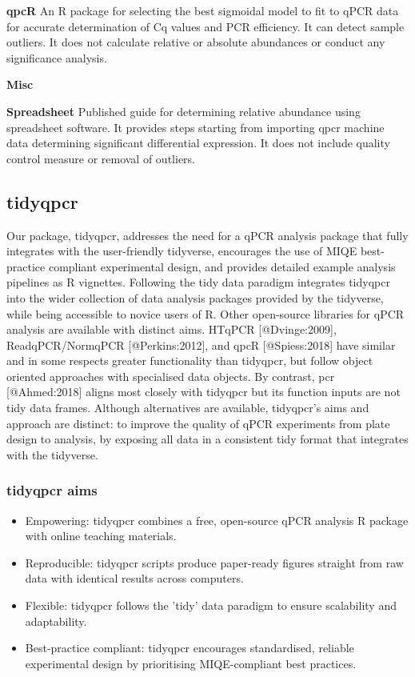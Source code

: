 \documentclass{SBCbookchapter}
\begin{document}
\textbf{qpcR} An R package for selecting the best sigmoidal model to fit to qPCR data for accurate determination of Cq values and PCR efficiency. It can detect sample outliers. It does not calculate relative or absolute abundances or conduct any significance analysis. \cite{Ritz2008}

\textbf{Misc}

\textbf{Spreadsheet} Published guide for determining relative abundance using spreadsheet software. It provides steps starting from importing qpcr machine data determining significant differential expression. It does not include quality control measure or removal of outliers. \cite{Ng2021}

\subsection{tidyqpcr}

Our package, tidyqpcr, addresses the need for a qPCR analysis package that fully integrates with the user-friendly tidyverse, encourages the use of MIQE best-practice compliant experimental design, and provides detailed example analysis pipelines as R vignettes. Following the tidy data paradigm integrates tidyqpcr into the wider collection of data analysis packages provided by the tidyverse, while being accessible to novice users of R. Other open-source libraries for qPCR analysis are available with distinct aims. HTqPCR [@Dvinge:2009], ReadqPCR/NormqPCR [@Perkins:2012], and qpcR [@Spiess:2018] have similar and in some respects greater functionality than tidyqpcr, but follow object oriented approaches with specialised data objects. By contrast, pcr [@Ahmed:2018] aligns most closely with tidyqpcr but its function inputs are not tidy data frames. Although alternatives are available, tidyqpcr's aims and approach are distinct: to improve the quality of qPCR experiments from plate design to analysis, by exposing all data in a consistent tidy format that integrates with the tidyverse.

\subsubsection{tidyqpcr aims}

\begin{itemize}
    \item Empowering: tidyqpcr combines a free, open-source qPCR analysis R package with online teaching materials.
    \item Reproducible: tidyqpcr scripts produce paper-ready figures straight from raw data with identical results across computers.
    \item Flexible: tidyqpcr follows the 'tidy' data paradigm to ensure scalability and adaptability.
    \item Best-practice compliant: tidyqpcr encourages standardised, reliable experimental design by prioritising MIQE-compliant best practices.
\end{itemize}
\end{document}
